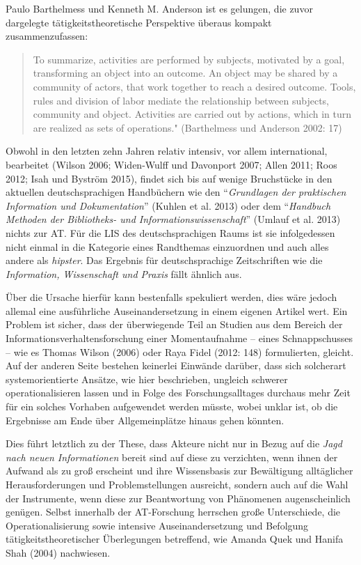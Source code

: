 \documentclass[a4paper,
fontsize=11pt,
oneside,
numbers=noperiodatend,
parskip=half-,
bibliography=totoc,
final
]{scrartcl}
\begin{document}
Paulo Barthelmess und Kenneth M. Anderson ist es gelungen, die zuvor
dargelegte tätigkeitstheoretische Perspektive überaus kompakt
zusammenzufassen:

\begin{quote}
To summarize, activities are performed by subjects, motivated by a goal,
transforming an object into an outcome. An object may be shared by a
community of actors, that work together to reach a desired outcome.
Tools, rules and division of labor mediate the relationship between
subjects, community and object. Activities are carried out by actions,
which in turn are realized as sets of operations." (Barthelmess und
Anderson 2002: 17)
\end{quote}

Obwohl in den letzten zehn Jahren relativ intensiv, vor allem
international, bearbeitet (Wilson 2006; Widen-Wulff und Davonport 2007;
Allen 2011; Roos 2012; Isah und Byström 2015), findet sich bis auf
wenige Bruchstücke in den aktuellen deutschsprachigen Handbüchern wie
den \enquote{\emph{Grundlagen der praktischen Information und
Dokumentation}} (Kuhlen et al. 2013) oder dem \enquote{\emph{Handbuch
Methoden der Bibliotheks- und Informationswissenschaft}} (Umlauf et al.
2013) nichts zur AT. Für die LIS des deutschsprachigen Raums ist sie
infolgedessen nicht einmal in die Kategorie eines Randthemas einzuordnen
und auch alles andere als \emph{hipster}. Das Ergebnis für
deutschsprachige Zeitschriften wie die \emph{Information, Wissenschaft
und Praxis} fällt ähnlich aus.

Über die Ursache hierfür kann bestenfalls spekuliert werden, dies wäre
jedoch allemal eine ausführliche Auseinandersetzung in einem eigenen
Artikel wert. Ein Problem ist sicher, dass der überwiegende Teil an
Studien aus dem Bereich der Informationsverhaltensforschung einer
Momentaufnahme -- eines Schnappschusses -- wie es Thomas Wilson (2006)
oder Raya Fidel (2012: 148) formulierten, gleicht. Auf der anderen Seite
bestehen keinerlei Einwände darüber, dass sich solcherart
systemorientierte Ansätze, wie hier beschrieben, ungleich schwerer
operationalisieren lassen und in Folge des Forschungsalltages durchaus
mehr Zeit für ein solches Vorhaben aufgewendet werden müsste, wobei
unklar ist, ob die Ergebnisse am Ende über Allgemeinplätze hinaus gehen
könnten.

Dies führt letztlich zu der These, dass Akteure nicht nur in Bezug auf
die \emph{Jagd nach neuen Informationen} bereit sind auf diese zu
verzichten, wenn ihnen der Aufwand als zu groß erscheint und ihre
Wissensbasis zur Bewältigung alltäglicher Herausforderungen und
Problemstellungen ausreicht, sondern auch auf die Wahl der Instrumente,
wenn diese zur Beantwortung von Phänomenen augenscheinlich genügen.
Selbst innerhalb der AT-Forschung herrschen große Unterschiede, die
Operationalisierung sowie intensive Auseinandersetzung und Befolgung
tätigkeitstheoretischer Überlegungen betreffend, wie Amanda Quek und
Hanifa Shah (2004) nachwiesen.
\end{document}

